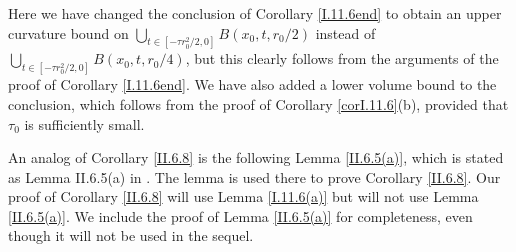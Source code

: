 Here we have changed the conclusion of Corollary \ref{I.11.6end} to obtain an
upper curvature bound on
$\bigcup_{ t \in [- \tau r_0^2/2, 0]} B(x_0, t, r_0/2)$
instead of $\bigcup_{ t \in [- \tau r_0^2/2, 0]} B(x_0, t, r_0/4)$,
but this clearly follows from the arguments of the proof of Corollary
\ref{I.11.6end}. We have also added a lower volume bound to the conclusion,
which follows from the proof of Corollary \ref{corI.11.6}(b), provided
that $\tau_0$ is sufficiently small.

An analog of Corollary \ref{II.6.8} is the following
Lemma \ref{II.6.5(a)}, which is stated as Lemma II.6.5(a)
in \cite{Perelman2}. The lemma is used there to prove Corollary \ref{II.6.8}.
Our proof of Corollary \ref{II.6.8} will use Lemma \ref{I.11.6(a)} but will
not use Lemma \ref{II.6.5(a)}.
We include the proof of Lemma \ref{II.6.5(a)} for completeness, even
though it will not be used in the sequel.


